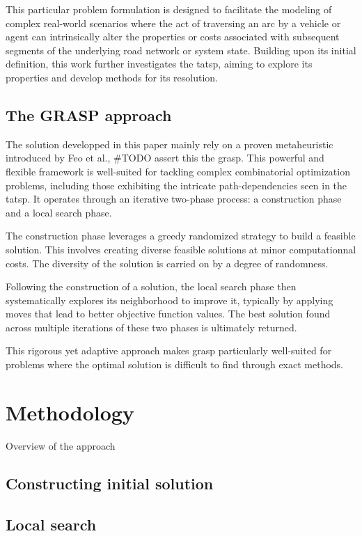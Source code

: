 \documentclass[twocolumn, switch]{article} %
\begin{document}
This particular problem formulation is designed to facilitate the modeling of complex real-world scenarios where the act of 
traversing an arc by a vehicle or agent can intrinsically alter the properties or costs associated with subsequent segments of 
the underlying road network or system state. Building upon its initial definition, this work further investigates the \gls{tatsp}, 
aiming to explore its properties and develop methods for its resolution.

\subsection{The GRASP approach}

The solution developped in this paper mainly rely on a proven metaheuristic introduced by Feo et al.\cite{Feo1995}, #TODO assert this the \gls{grasp}. 
This powerful and flexible framework is well-suited for tackling complex combinatorial optimization problems, 
including those exhibiting the intricate path-dependencies seen in the \gls{tatsp}. It operates through an iterative 
two-phase process: a construction phase and a local search phase. 

The construction phase leverages a greedy randomized strategy to build a feasible solution. This involves creating diverse feasible 
solutions at minor computationnal costs. The diversity of the solution is carried on by a degree of randomness. 

Following the construction of a solution, the local search phase then systematically explores its neighborhood to improve it, 
typically by applying moves that lead to better objective function values. The best solution found across multiple iterations of 
these two phases is ultimately returned. 

This rigorous yet adaptive approach makes \gls{grasp} particularly well-suited for problems where the optimal solution is difficult 
to find through exact methods.

\section{Methodology}
Overview of the approach 

\subsection{Constructing initial solution}
\lipsum[5]

\subsection{Local search}
\lipsum[6]
\end{document}

